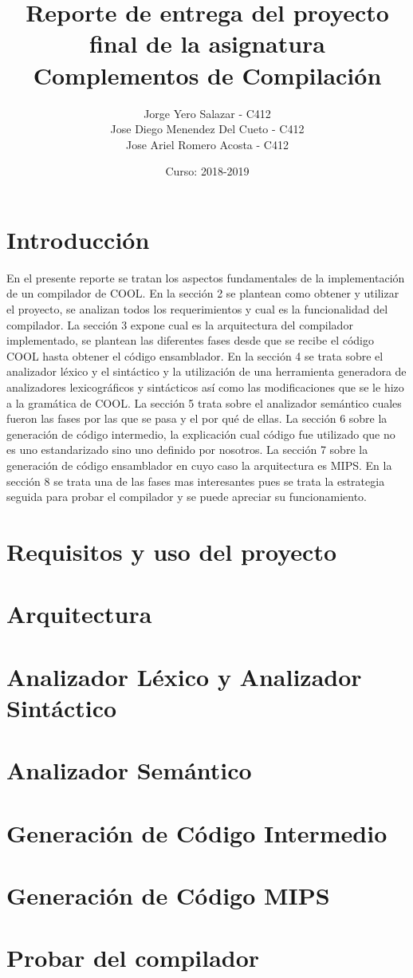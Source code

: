 \documentclass[12pt,a4paper]{article}
\author{Jorge Yero Salazar - C412\\ Jose Diego Menendez Del Cueto - C412\\ Jose Ariel Romero Acosta - C412}
\title{Reporte de entrega del proyecto final de la
	asignatura Complementos de Compilación}
\date{Curso: 2018-2019}
\begin{document}
	\maketitle
	\tableofcontents
	\section{Introducción}
		En el presente reporte se tratan los aspectos fundamentales de la implementación de un compilador de COOL. En la sección 2 se plantean como obtener y utilizar el proyecto, se analizan todos los requerimientos y cual es la funcionalidad del compilador. La sección 3 expone cual es la arquitectura del compilador implementado, se plantean las diferentes fases desde que se recibe el código COOL hasta obtener el código ensamblador. En la sección 4 se trata sobre el analizador léxico y el sintáctico y la utilización de una herramienta generadora de analizadores lexicográficos y sintácticos así como las modificaciones que se le hizo a la gramática de COOL. La sección 5 trata sobre el analizador semántico cuales fueron las fases por las que se pasa y el por qué de ellas. La sección 6 sobre la generación de código intermedio, la explicación cual código fue utilizado que no es uno estandarizado sino uno definido por nosotros. La sección 7 sobre la generación de código ensamblador en cuyo caso la arquitectura es MIPS. En la sección 8 se trata una de las fases mas interesantes pues se trata la estrategia seguida para probar el compilador y se puede apreciar su funcionamiento.
	\section{Requisitos y uso del proyecto}
	\section{Arquitectura}
	\section{Analizador Léxico y Analizador Sintáctico}
	\section{Analizador Semántico}
	\section{Generación de Código Intermedio}
	\section{Generación de Código MIPS}
	\section{Probar del compilador}
\end{document}
